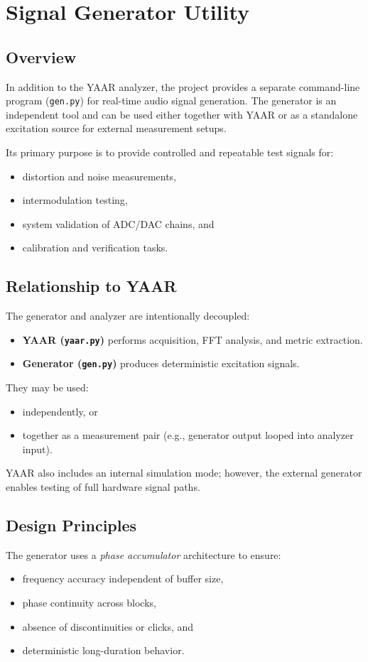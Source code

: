 \documentclass[conference]{IEEEtran}
\begin{document}
\section{Signal Generator Utility}

\subsection{Overview}
In addition to the YAAR analyzer, the project provides a separate command-line program (\texttt{gen.py}) for real-time audio signal generation. The generator is an independent tool and can be used either together with YAAR or as a standalone excitation source for external measurement setups.

Its primary purpose is to provide controlled and repeatable test signals for:
\begin{itemize}[leftmargin=*,nosep]
    \item distortion and noise measurements,
    \item intermodulation testing,
    \item system validation of ADC/DAC chains, and
    \item calibration and verification tasks.
\end{itemize}

\subsection{Relationship to YAAR}
The generator and analyzer are intentionally decoupled:
\begin{itemize}[leftmargin=*,nosep]
    \item \textbf{YAAR (\texttt{yaar.py})} performs acquisition, FFT analysis, and metric extraction.
    \item \textbf{Generator (\texttt{gen.py})} produces deterministic excitation signals.
\end{itemize}

They may be used:
\begin{itemize}[leftmargin=*,nosep]
    \item independently, or
    \item together as a measurement pair (e.g., generator output looped into analyzer input).
\end{itemize}

YAAR also includes an internal simulation mode; however, the external generator enables testing of full hardware signal paths.

\subsection{Design Principles}
The generator uses a \textit{phase accumulator} architecture to ensure:
\begin{itemize}[leftmargin=*,nosep]
    \item frequency accuracy independent of buffer size,
    \item phase continuity across blocks,
    \item absence of discontinuities or clicks, and
    \item deterministic long-duration behavior.
\end{itemize}
\end{document}
